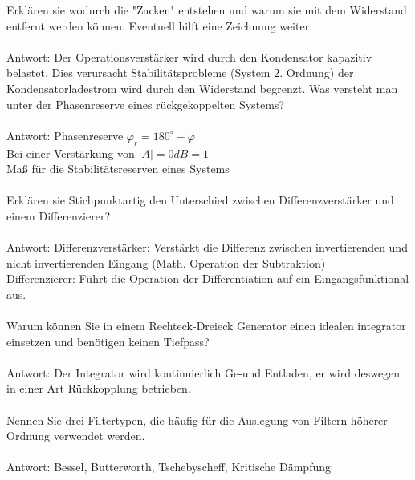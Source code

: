 \documentclass[A4]{scrartcl}
\begin{document}
  Erklären sie wodurch die "Zacken" entstehen und warum sie mit dem Widerstand entfernt werden können. Eventuell hilft eine Zeichnung weiter.\\
  \\
  Antwort: Der Operationsverstärker wird durch den Kondensator kapazitiv belastet. Dies verursacht Stabilitätsprobleme (System 2. Ordnung) der Kondensatorladestrom wird durch den Widerstand begrenzt. 
  Was versteht man unter der Phasenreserve eines rückgekoppelten Systems?\\
  \\
  Antwort: Phasenreserve $ \varphi_r = 180^\circ - \varphi$\\
  Bei einer Verstärkung von $|A|=0dB=1$\\
  Maß für die Stabilitätsreserven eines Systems\\\\
  Erklären sie Stichpunktartig den Unterschied zwischen Differenzverstärker und einem Differenzierer?\\
  \\
  Antwort:
  Differenzverstärker: Verstärkt die Differenz zwischen invertierenden und nicht invertierenden Eingang (Math. Operation der Subtraktion)\\
  Differenzierer: Führt die Operation der Differentiation auf ein Eingangsfunktional aus.\\\\
  Warum können Sie in einem Rechteck-Dreieck Generator einen idealen integrator einsetzen und benötigen keinen Tiefpass?\\
  \\
  Antwort: Der Integrator wird kontinuierlich Ge-und Entladen, er wird deswegen in einer Art Rückkopplung betrieben.\\\\
  Nennen Sie drei Filtertypen, die häufig für die Auslegung von Filtern höherer Ordnung verwendet werden.\\
  \\
  Antwort: Bessel, Butterworth, Tschebyscheff, Kritische Dämpfung\\\\
\end{document}
